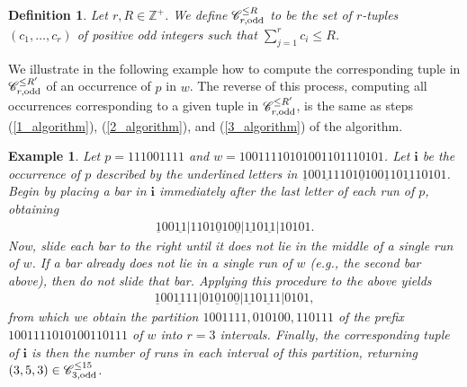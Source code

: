 \documentclass[11pt]{amsart}
\newtheorem{definition}[theorem]{Definition}
\newtheorem{ex}[theorem]{Example}
\newcommand{\ZZ}{\mathbb{Z}}
\begin{document}
\begin{definition}
    Let $r,R\in\ZZ^+$. We define $\mathscr{C}_{r,\text{\normalfont odd}}^{\leq R}$ to be the set of $r$-tuples $(c_1,\dots,c_r)$ of positive odd integers such that $\sum_{j=1}^{r}c_i\leq R$.
\end{definition}

We illustrate in the following example how to compute the corresponding tuple in $\mathscr{C}_{r,\text{\normalfont odd}}^{\leq R'}$ of an occurrence of $p$ in $w$. The reverse of this process, computing all occurrences corresponding to a given tuple in $\mathscr{C}_{r,\text{\normalfont odd}}^{\leq R'}$, is the same as steps (\ref{1_algorithm}), (\ref{2_algorithm}), and (\ref{3_algorithm}) of the algorithm.

\begin{ex}\label{inverse_of_algorithm}
    \normalfont Let $p=111001111$ and $w=10011110101001101110101$. Let $\mathbf{i}$ be the occurrence of $p$ described by the underlined letters in $\underline{1}00\underline{11}1101\underline{0}10\underline{011}0\underline{11}10101$. Begin by placing a bar in $\mathbf{i}$ immediately after the last letter of each run of $p$, obtaining
    \begin{align*}
        \underline{1}00\underline{11}\Big|1101\underline{0}10\underline{0}\Big|\underline{11}0\underline{11}\Big|10101.
    \end{align*}
    Now, slide each bar to the right until it does not lie in the middle of a single run of $w$. If a bar already does not lie in a single run of $w$ (e.g., the second bar above), then do not slide that bar. Applying this procedure to the above yields
    \begin{align*}
        \underline{1}00\underline{11}11\Big|01\underline{0}10\underline{0}\Big|\underline{11}0\underline{11}1\Big|0101,
    \end{align*}
    from which we obtain the partition $1001111,010100,110111$ of the prefix $1001111010100110111$ of $w$ into $r=3$ intervals. Finally, the corresponding tuple of $\mathbf{i}$ is then the number of runs in each interval of this partition, returning $(3,5,3)\in \mathscr{C}_{3,\text{\normalfont odd}}^{\leq 15}$. 
\end{ex}
\end{document}

